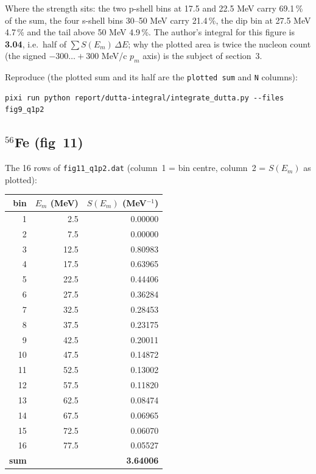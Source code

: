 \documentclass[11pt]{article}
\begin{document}
Where the strength sits: the two p-shell bins at 17.5 and 22.5 MeV carry
69.1\,\% of the sum, the four s-shell bins 30--50 MeV carry 21.4\,\%, the dip
bin at 27.5 MeV 4.7\,\% and the tail above 50 MeV 4.9\,\%. The author's
integral for this figure is \textbf{3.04}, i.e.\ half of
$\sum S(E_m)\,\Delta E$; why the plotted area is twice the nucleon count (the
signed $-300 \ldots +300$ MeV/c $p_m$ axis) is the subject of section~3.

Reproduce (the plotted sum and its half are the \texttt{plotted sum} and
\texttt{N} columns):
\begin{verbatim}
pixi run python report/dutta-integral/integrate_dutta.py --files fig9_q1p2
\end{verbatim}

\subsection{\texorpdfstring{$^{56}$Fe}{Fe56} (fig~11)}

The 16 rows of \texttt{fig11\_q1p2.dat} (column~1 = bin centre, column~2 =
$S(E_m)$ as plotted):

\begin{center}
\begin{tabular}{rrr}
\toprule
bin & $E_m$ (MeV) & $S(E_m)$ (MeV$^{-1}$) \\
\midrule
1 & 2.5 & 0.00000 \\
2 & 7.5 & 0.00000 \\
3 & 12.5 & 0.80983 \\
4 & 17.5 & 0.63965 \\
5 & 22.5 & 0.44406 \\
6 & 27.5 & 0.36284 \\
7 & 32.5 & 0.28453 \\
8 & 37.5 & 0.23175 \\
9 & 42.5 & 0.20011 \\
10 & 47.5 & 0.14872 \\
11 & 52.5 & 0.13002 \\
12 & 57.5 & 0.11820 \\
13 & 62.5 & 0.08474 \\
14 & 67.5 & 0.06965 \\
15 & 72.5 & 0.06070 \\
16 & 77.5 & 0.05527 \\
\midrule
\textbf{sum} & & \textbf{3.64006} \\
\bottomrule
\end{tabular}
\end{center}
\end{document}
